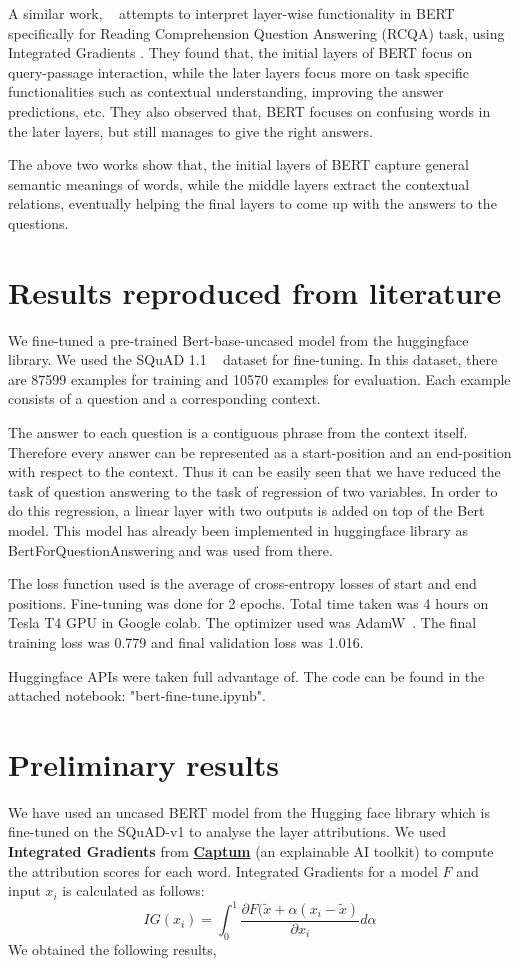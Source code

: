 \documentclass[10pt,twocolumn,letterpaper]{article}
\begin{document}
    A similar work, ~\cite{bert_for_qa} attempts to interpret layer-wise functionality in BERT specifically for Reading Comprehension Question Answering (RCQA) task, using Integrated Gradients . They found that, the initial layers of BERT focus on query-passage interaction, while the later layers focus more on task specific functionalities such as contextual understanding, improving the answer predictions, etc. They also observed that, BERT focuses on confusing words in the later layers, but still manages to give the right answers.

The above two works show that, the initial layers of BERT capture general semantic meanings of words, while the middle layers extract the contextual relations, eventually helping the final layers to come up with the answers to the questions.

\section{Results reproduced from literature}
We fine-tuned a pre-trained Bert-base-uncased model from the huggingface library. We used the SQuAD 1.1 ~\cite{squad} dataset for fine-tuning. In this dataset, there are 87599 examples for training and 10570 examples for evaluation. Each example consists of a question and a corresponding context. 

The answer to each question is a contiguous phrase from the context itself. Therefore every answer can be represented as a start-position and an end-position with respect to the context. Thus it can be easily seen that we have reduced the task of question answering to the task of regression of two variables. In order to do this regression, a linear layer with two outputs is added on top of the Bert model. This model has already been implemented in huggingface library as BertForQuestionAnswering and was used from there.

The loss function used is the average of cross-entropy losses of start and end positions. Fine-tuning was done for 2 epochs. Total time taken was 4 hours on Tesla T4 GPU in Google colab. The optimizer used was AdamW~\cite{AdamW}. The final training loss was 0.779 and final validation loss was 1.016.

Huggingface APIs were taken full advantage of. The code can be found in the attached notebook: "bert-fine-tune.ipynb".

\section{Preliminary results}
We have used an uncased BERT model from the Hugging face library which is fine-tuned on the SQuAD-v1 to analyse the layer attributions. We used \textbf{Integrated Gradients} from \href{https://captum.ai/}{\textbf{Captum}} (an explainable AI toolkit) to compute the attribution scores for each word.
Integrated Gradients for a model $F$ and input $x_i$ is calculated as follows:
\begin{equation}
    \displaystyle IG(x_i) = \int_{0}^{1}\frac{\partial F(\tilde{x}+\alpha(x_i - \tilde{x} )}{\partial x_i} d\alpha
\end{equation}
We obtained the following results,\\
\end{document}
